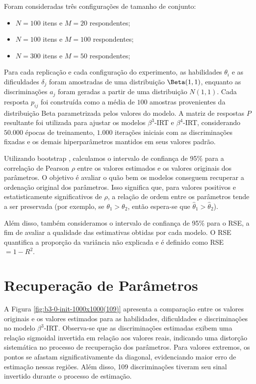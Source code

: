 Foram consideradas três configurações de tamanho de conjunto:

\begin{itemize}
    \item $N = 100$ itens e $M = 20$ respondentes;
    \item $N = 100$ itens e $M = 100$ respondentes;
    \item $N = 300$ itens e $M = 50$ respondentes;
\end{itemize}

Para cada replicação e cada configuração do experimento, as habilidades $\theta_i$ e as dificuldades $\delta_j$ foram amostradas de uma distribuição $\Beta(1,1)$, enquanto as discriminações $a_j$ foram geradas a partir de uma distribuição $N(1,1)$. Cada resposta $p_{ij}$ foi construída como a média de $100$ amostras provenientes da distribuição Beta parametrizada pelos valores do modelo. A matriz de respostas $P$ resultante foi utilizada para ajustar os modelos $\beta^3$-\gls{IRT} e $\beta^4$-\gls{IRT}, considerando $50.000$ épocas de treinamento, $1.000$ iterações iniciais com as discriminações fixadas e os demais hiperparâmetros mantidos em seus valores padrão.

Utilizando bootstrap \cite{hesterberg2011bootstrap}, calculamos o intervalo de confiança de 95\% para a correlação de Pearson $\rho$ entre os valores estimados e os valores originais dos parâmetros. O objetivo é avaliar o quão bem os modelos conseguem recuperar a ordenação original dos parâmetros. Isso significa que, para valores positivos e estatisticamente significativos de $\rho$, a relação de ordem entre os parâmetros tende a ser preservada (por exemplo, se $\theta_1 > \theta_2$, então espera-se que $\hat{\theta}_1 > \hat{\theta}_2$).

Além disso, também consideramos o intervalo de confiança de 95\% para o \gls{RSE}, a fim de avaliar a qualidade das estimativas obtidas por cada modelo. O RSE quantifica a proporção da variância não explicada e é definido como \gls{RSE}$ = 1 - R^2$.

\section{Recuperação de Parâmetros} %

A Figura \ref{fig:b3-0-init-1000x1000(109)} apresenta a comparação entre os valores originais e os valores estimados para as habilidades, dificuldades e discriminações no modelo $\beta^3$-\gls{IRT}. Observa-se que as discriminações estimadas exibem uma relação sigmoidal invertida em relação aos valores reais, indicando uma distorção sistemática no processo de recuperação dos parâmetros. Para valores extremos, os pontos se afastam significativamente da diagonal, evidenciando maior erro de estimação nessas regiões. Além disso, 109 discriminações tiveram seu sinal invertido durante o processo de estimação.

